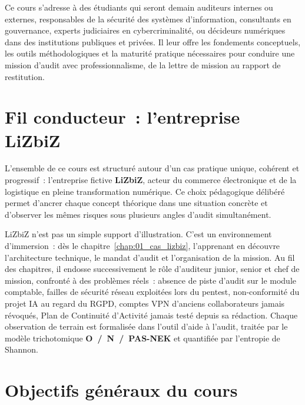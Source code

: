 Ce cours s'adresse à des étudiants qui seront demain auditeurs internes ou externes, responsables de la sécurité des systèmes d'information, consultants en gouvernance, experts judiciaires en cybercriminalité, ou décideurs numériques dans des institutions publiques et privées. Il leur offre les fondements conceptuels, les outils méthodologiques et la maturité pratique nécessaires pour conduire une mission d'audit avec professionnalisme, de la lettre de mission au rapport de restitution.

\section*{Fil conducteur~: l'entreprise LiZbiZ}

L'ensemble de ce cours est structuré autour d'un cas pratique unique, cohérent et progressif~: l'entreprise fictive \textbf{LiZbiZ}, acteur du commerce électronique et de la logistique en pleine transformation numérique. Ce choix pédagogique délibéré permet d'ancrer chaque concept théorique dans une situation concrète et d'observer les mêmes risques sous plusieurs angles d'audit simultanément.

LiZbiZ n'est pas un simple support d'illustration. C'est un environnement d'immersion~: dès le chapitre~\ref{chap:01_cas_lizbiz}, l'apprenant en découvre l'architecture technique, le mandat d'audit et l'organisation de la mission. Au fil des chapitres, il endosse successivement le rôle d'auditeur junior, senior et chef de mission, confronté à des problèmes réels~: absence de piste d'audit sur le module comptable, failles de sécurité réseau exploitées lors du pentest, non-conformité du projet IA au regard du RGPD, comptes VPN d'anciens collaborateurs jamais révoqués, Plan de Continuité d'Activité jamais testé depuis sa rédaction. Chaque observation de terrain est formalisée dans l'outil d'aide à l'audit, traitée par le modèle trichotomique \textbf{O~/~N~/~PAS-NEK} et quantifiée par l'entropie de Shannon.

\section*{Objectifs généraux du cours}

